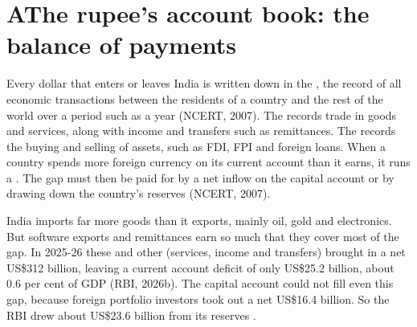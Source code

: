 \section*{A\quad The rupee's account book: the balance of payments}

Every dollar that enters or leaves India is written down in the , the record of all economic transactions between the residents of a country and the rest of the world over a period such as a year (NCERT, 2007). The  records trade in goods and services, along with income and transfers such as remittances. The  records the buying and selling of assets, such as FDI, FPI and foreign loans. When a country spends more foreign currency on its current account than it earns, it runs a . The gap must then be paid for by a net inflow on the capital account or by drawing down the country's reserves (NCERT, 2007).

India imports far more goods than it exports, mainly oil, gold and electronics. But software exports and remittances earn so much that they cover most of the gap. In 2025-26 these and other  (services, income and transfers) brought in a net US\$312 billion, leaving a current account deficit of only US\$25.2 billion, about 0.6 per cent of GDP (RBI, 2026b). The capital account could not fill even this gap, because foreign portfolio investors took out a net US\$16.4 billion. So the RBI drew about US\$23.6 billion from its reserves .
